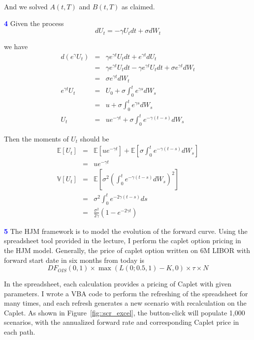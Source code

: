 \documentclass[a4paper,11pt] {article}
\begin{document}
And we solved $A(t,T)$ and $B(t,T)$ as claimed.

\bigskip

\textcolor{blue}{\bf 4 } Given the process
$$
dU_t = -\gamma U_t dt + \sigma dW_t
$$

we have
\begin{eqnarray*}
d(e^{\gamma }U_t) &=& \gamma e^{\gamma t} U_t dt + e^{\gamma t} d U_t \\
                  &=& \gamma e^{\gamma t} U_t dt - \gamma e^{\gamma t} U_t dt +  \sigma e^{\gamma t} dW_t \\
                  &=& \sigma e^{\gamma t} dW_t \\
e^{\gamma t} U_t  &=& U_0 + \sigma \int_{0}^{t}e^{\gamma s} dW_s \\
                  &=& u + \sigma \int_{0}^{t}e^{\gamma s} dW_s \\
U_t               &=& ue^{-\gamma t} + \sigma \int_0^t e^{-\gamma (t-s)} dW_s
\end{eqnarray*}

Then the moments of $U_t$ should be
\begin{eqnarray*}
\mathbb{E}[U_t] &=&  \mathbb{E}[ue^{-\gamma t}] + \mathbb{E}[\sigma \int_0^t e^{-\gamma (t-s)} dW_s] \\
                &=&  ue^{-\gamma t}  \\
\mathbb{V}[U_t] &=&  \mathbb{E}\left[ \sigma^2 \left( \int_0^t e^{-\gamma(t-s)}dW_s \right)^2 \right]  \\
                &=&  \sigma^2 \int_0^t e^{-2\gamma(t-s)} ds \\
                &=&  \frac{\sigma^2}{2\gamma} (1-e^{-2\gamma t})
\end{eqnarray*}

\bigskip

\textcolor{blue}{\bf 5 } The HJM framework is to model the evolution of the forward curve. Using the spreadsheet tool provided in the lecture, I perform the caplet option pricing in the HJM model. Generally, the price of caplet option written on 6M LIBOR with forward start date in six months from today is
$$
DF_{OIS}(0,1) \times \max(L(0;0.5,1)-K,0) \times \tau \times N
$$

In the spreadsheet, each calculation provides a pricing of Caplet with given parameters. I wrote a VBA code to perform the refreshing of the spreadsheet for many times, and each refresh generates a new scenario with recalculation on the Caplet. As shown in Figure~\ref{fig::scr_excel}, the button-click will populate 1,000 scenarios, with the annualized forward rate and corresponding Caplet price in each path.
\end{document}

